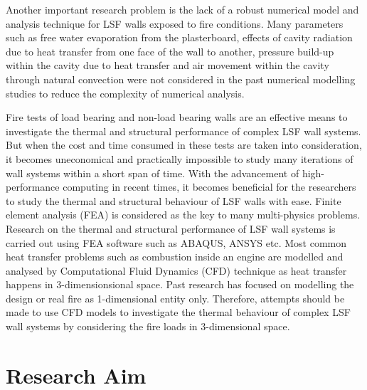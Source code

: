 Another important research problem is the lack of a robust numerical model and analysis technique for LSF walls exposed to fire conditions. Many parameters such as free water evaporation from the plasterboard, effects of cavity radiation due to heat transfer from one face of the wall to another, pressure build-up within the cavity due to heat transfer and air movement within the cavity through natural convection were not considered in the past numerical modelling studies to reduce the complexity of numerical analysis. 

Fire tests of load bearing and non-load bearing walls are an effective means to investigate the thermal and structural performance of complex LSF wall systems. But when the cost and time consumed in these tests are taken into consideration, it becomes uneconomical and practically impossible to study many iterations of wall systems within a short span of time. With the advancement of high-performance computing in recent times, it becomes beneficial for the researchers to study the thermal and structural behaviour of LSF walls with ease. Finite element analysis (FEA) is considered as the key to many multi-physics problems. Research on the thermal and structural performance of LSF wall systems is carried out using FEA software such as ABAQUS, ANSYS etc. Most common heat transfer problems such as combustion inside an engine are modelled and analysed by Computational Fluid Dynamics (CFD) technique as heat transfer happens in 3-dimensionsional space. Past research has focused on modelling the design or real fire as 1-dimensional entity only. Therefore, attempts should be made to use CFD models to investigate the thermal behaviour of complex LSF wall systems by considering the fire loads in 3-dimensional space.

\section{Research Aim}\label{sec:research-aim}


